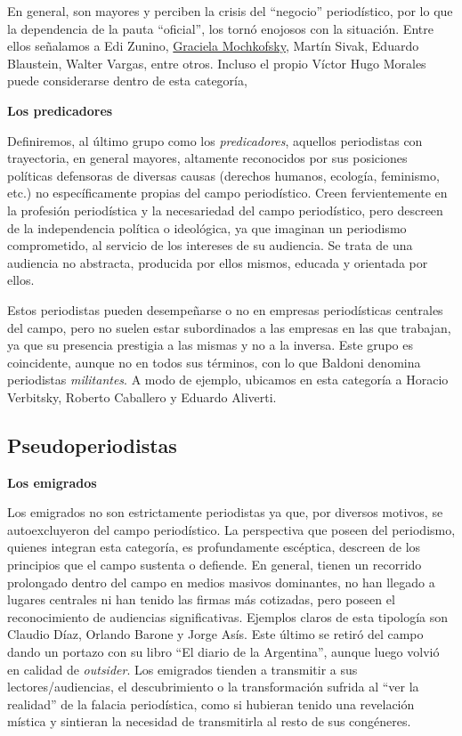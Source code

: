 En general, son mayores y perciben la crisis del ``negocio'' periodístico, por lo que la dependencia de la pauta ``oficial'', los tornó enojosos con la situación. Entre ellos señalamos a Edi Zunino, \href{http://www.tematika.com/buscar.do?seccionDeBusqueda=En+Libros\&seccion=1\&claveDeBusqueda=porAutor\&txtencoded=Graciela+Mochkofsky\&idAutor=35432\&criterioDeOrden=2\&idSeccion=1\&texto=Graciela+Mochkofsky\&optSeleccionada=Autor\&idSeccionPropia=1}{Graciela Mochkofsky}, Martín Sivak, Eduardo Blaustein, Walter Vargas, entre otros. Incluso el propio Víctor Hugo Morales puede considerarse dentro de esta categoría,

\textbf{Los predicadores}

Definiremos, al último grupo como los \emph{predicadores}, aquellos periodistas con trayectoria, en general mayores, altamente reconocidos por sus posiciones políticas defensoras de diversas causas (derechos humanos, ecología, feminismo, etc.) no específicamente propias del campo periodístico. Creen fervientemente en la profesión periodística y la necesariedad del campo periodístico, pero descreen de la independencia política o ideológica, ya que imaginan un periodismo comprometido, al servicio de los intereses de su audiencia. Se trata de una audiencia no abstracta, producida por ellos mismos, educada y orientada por ellos.

Estos periodistas pueden desempeñarse o no en empresas periodísticas centrales del campo, pero no suelen estar subordinados a las empresas en las que trabajan, ya que su presencia prestigia a las mismas y no a la inversa. Este grupo es coincidente, aunque no en todos sus términos, con lo que Baldoni denomina periodistas \emph{militantes}. A modo de ejemplo, ubicamos en esta categoría a Horacio Verbitsky, Roberto Caballero y Eduardo Aliverti.


\subsection{Pseudoperiodistas}

\textbf{Los emigrados}

Los emigrados no son estrictamente periodistas ya que, por diversos motivos, se autoexcluyeron del campo periodístico. La perspectiva que poseen del periodismo, quienes integran esta categoría, es profundamente escéptica, descreen de los principios que el campo sustenta o defiende. En general, tienen un recorrido prolongado dentro del campo en medios masivos dominantes, no han llegado a lugares centrales ni han tenido las firmas más cotizadas, pero poseen el reconocimiento de audiencias significativas. Ejemplos claros de esta tipología son Claudio Díaz, Orlando Barone y Jorge Asís. Este último se retiró del campo dando un portazo con su libro ``El diario de la Argentina'', aunque luego volvió en calidad de \emph{outsider}. Los emigrados tienden a transmitir a sus lectores/audiencias, el descubrimiento o la transformación sufrida al ``ver la realidad'' de la falacia periodística, como si hubieran tenido una revelación mística y sintieran la necesidad de transmitirla al resto de sus congéneres.

